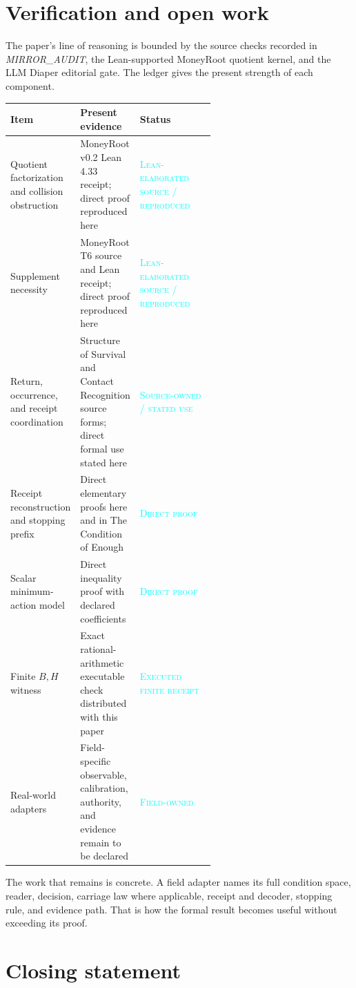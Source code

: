 \documentclass[11pt]{article}
\newcommand{\status}[1]{{\small\textcolor{cyan}{\textsc{#1}}}}
\begin{document}
\section{Verification and open work}

The paper's line of reasoning is bounded by the source checks recorded in \textit{MIRROR\_AUDIT}, the Lean-supported MoneyRoot quotient kernel, and the LLM Diaper editorial gate. The ledger gives the present strength of each component.

\begin{center}
\begin{tabularx}{\linewidth}{@{}p{0.34\linewidth}p{0.25\linewidth}Y@{}}
\toprule
Item & Present evidence & Status \\
\midrule
Quotient factorization and collision obstruction & MoneyRoot v0.2 Lean 4.33 receipt; direct proof reproduced here & \status{Lean-elaborated source / reproduced} \\
Supplement necessity & MoneyRoot T6 source and Lean receipt; direct proof reproduced here & \status{Lean-elaborated source / reproduced} \\
Return, occurrence, and receipt coordination & Structure of Survival and Contact Recognition source forms; direct formal use stated here & \status{Source-owned / stated use} \\
Receipt reconstruction and stopping prefix & Direct elementary proofs here and in The Condition of Enough & \status{Direct proof} \\
Scalar minimum-action model & Direct inequality proof with declared coefficients & \status{Direct proof} \\
Finite $B,H$ witness & Exact rational-arithmetic executable check distributed with this paper & \status{Executed finite receipt} \\
Real-world adapters & Field-specific observable, calibration, authority, and evidence remain to be declared & \status{Field-owned} \\
\bottomrule
\end{tabularx}
\end{center}

The work that remains is concrete. A field adapter names its full condition space, reader, decision, carriage law where applicable, receipt and decoder, stopping rule, and evidence path. That is how the formal result becomes useful without exceeding its proof.

\section*{Closing statement}
\end{document}
